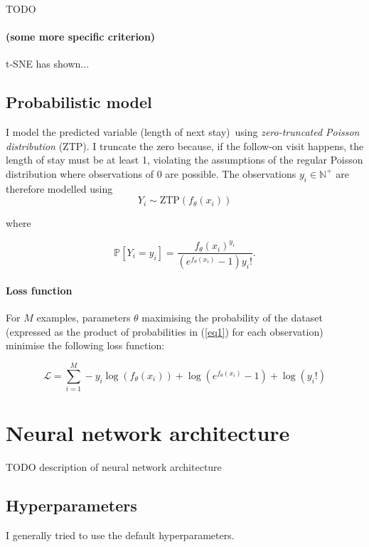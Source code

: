 \documentclass[10pt, twocolumn]{article}
\begin{document}
TODO \paragraph{(some more specific criterion)} t-SNE has shown...


\subsection{Probabilistic model}

I model the predicted variable (length of next stay) using \textit{zero-truncated Poisson distribution} (ZTP). I truncate the zero because, if the follow-on visit happens, the length of stay must be at least 1, violating the assumptions of the regular Poisson distribution where observations of 0 are possible. The observations $y_i \in \mathbb{N}^+$ are therefore modelled using \[Y_i \sim \mathrm{ZTP}(f_\theta(x_i))\]

where 

\begin{equation}
	\mathbb{P}[Y_i = y_i] = \frac{f_\theta(x_i)^{y_i}}{(e^{f_\theta(x_i)} - 1)y_i!}.
	\label{eq1}
\end{equation}

\paragraph{Loss function} For $M$ examples, parameters $\theta$ maximising the probability of the dataset (expressed as the product of probabilities in (\ref{eq1}) for each observation) minimise the following loss function:

\begin{equation}
	\mathcal{L} = \sum\limits_{i=1}^{M} -y_i \log(f_\theta(x_i)) + \log(e^{f_\theta(x_i)} - 1) + \log(y_i!)
\end{equation}



\section{Neural network architecture}

TODO description of neural network architecture


\subsection{Hyperparameters}
I generally tried to use the default hyperparameters. 
\end{document}
